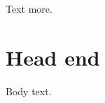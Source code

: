 \documentclass{article}
\begin{document}
\tableofcontents
Text  more.

\section{Head  end}

Body text.
\end{document}
